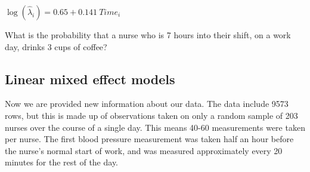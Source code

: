 \documentclass[11pt]{article}
\begin{document}
$\log(\widehat{\lambda}_i) = 0.65 + 0.141 \ Time_i$

What is the probability that a nurse who is 7 hours into their shift, on a work day, drinks 3 cups of coffee? 


\pagebreak

\subsection{Linear mixed effect models}

Now we are provided new information about our data. The data include 9573 rows, but this is made up of observations taken on only a random sample of 203 nurses over the course of a single day. This means 40-60 measurements were taken per nurse. The first blood pressure measurement was taken half an hour before the nurse's normal start of work, and was measured approximately every 20 minutes for the rest of the day.
\end{document}
